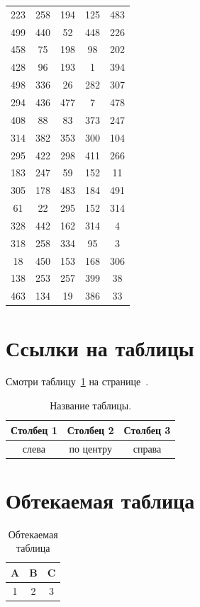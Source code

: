 \documentclass[a4paper,12pt]{article}
\begin{document}
\begin{longtable}{|c|c|c|c|c|}
223 & 258 & 194 & 125 & 483 \\
499 & 440 & 52 & 448 & 226 \\
458 & 75 & 198 & 98 & 202 \\
428 & 96 & 193 & 1 & 394 \\
498 & 336 & 26 & 282 & 307 \\
294 & 436 & 477 & 7 & 478 \\
408 & 88 & 83 & 373 & 247 \\
314 & 382 & 353 & 300 & 104 \\
295 & 422 & 298 & 411 & 266 \\
183 & 247 & 59 & 152 & 11 \\
305 & 178 & 483 & 184 & 491 \\
61 & 22 & 295 & 152 & 314 \\
328 & 442 & 162 & 314 & 4 \\
318 & 258 & 334 & 95 & 3 \\
18 & 450 & 153 & 168 & 306 \\
138 & 253 & 257 & 399 & 38 \\
463 & 134 & 19 & 386 & 33 \\
\end{longtable}

\section{Ссылки на таблицы}

Смотри таблицу~\ref{tab:mytab} на странице~\pageref{tab:mytab}.

\begin{table}[!h]
\centering
\caption{Название таблицы.}
\label{tab:mytab}
\begin{tabular}{|c|c|c|}
\hline
Столбец 1 & Столбец 2 & Столбец 3 \\
\hline
слева & по центру & справа \\
\hline
\end{tabular}
\end{table}

\section{Обтекаемая таблица}

\lipsum[1-2]

\begin{table}
\centering
\caption{Обтекаемая таблица}
\begin{tabular}{|c|c|c|}
\hline
A & B & C \\
\hline
1 & 2 & 3 \\
\hline
\end{tabular}
\end{table}

\lipsum[3-4]

\listoftables
\end{document}
